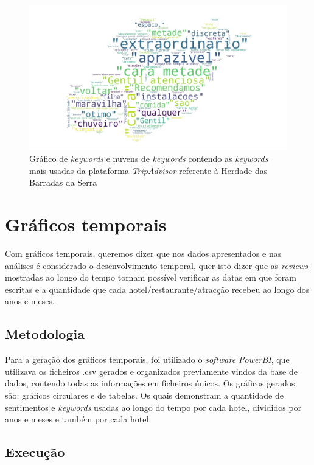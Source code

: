 \begin{figure}[!htb]
\centering
\includegraphics[width=14cm]{figuras/TripAdvisor/Hotels/hotel21_keywordcloud.jpeg}
\caption{Gráfico de \textit{keywords} e nuvens de \textit{keywords} contendo as \textit{keywords} mais usadas da plataforma \textit{TripAdvisor} referente à Herdade das Barradas da Serra}
\label{fig:exemplofig21cloudTrip}
\end{figure}

\section{Gráficos temporais}

Com gráficos temporais, queremos dizer que nos dados apresentados e nas análises é considerado o desenvolvimento temporal, quer isto dizer que as \textit{reviews} mostradas ao longo do tempo tornam possível verificar as datas em que foram escritas e a quantidade que cada hotel/restaurante/atracção recebeu ao longo dos anos e meses.

\subsection{Metodologia}

Para a geração dos gráficos temporais, foi utilizado o \textit{software PowerBI}, que utilizava os ficheiros .csv gerados e organizados previamente vindos da base de dados, contendo todas as informações em ficheiros únicos.
Os gráficos gerados são: gráficos circulares e de tabelas. Os quais demonstram a quantidade de sentimentos e \textit{keywords} usadas ao longo do tempo por cada hotel, divididos por anos e meses e também por cada hotel.

\subsection{Execução}

